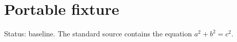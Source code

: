 \documentclass{article}
\begin{document}
\section*{Portable fixture}
Status: baseline.
The standard source contains the equation $a^2+b^2=c^2$.
\end{document}

